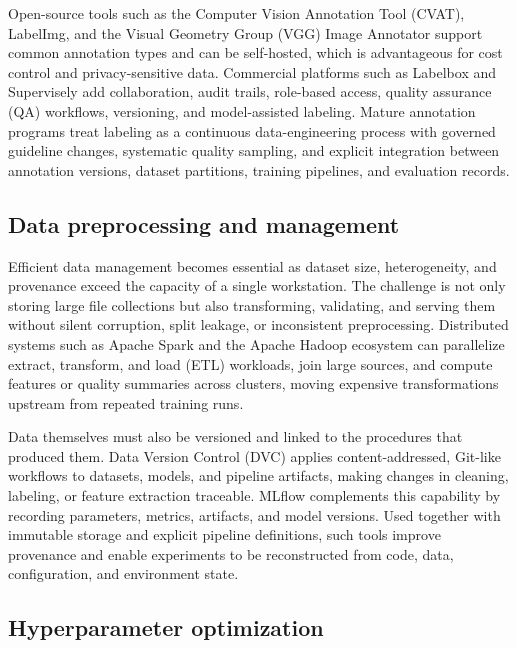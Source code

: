 \documentclass{article}
\newcounter{type}[section]
\begin{document}
Open-source tools such as the Computer Vision Annotation Tool (CVAT), LabelImg, and the Visual Geometry Group (VGG) Image Annotator support common annotation types and can be self-hosted, which is advantageous for cost control and privacy-sensitive data. Commercial platforms such as Labelbox and Supervisely add collaboration, audit trails, role-based access, quality assurance (QA) workflows, versioning, and model-assisted labeling. Mature annotation programs treat labeling as a continuous data-engineering process with governed guideline changes, systematic quality sampling, and explicit integration between annotation versions, dataset partitions, training pipelines, and evaluation records.


\subsection{Data preprocessing and management}

Efficient data management becomes essential as dataset size, heterogeneity, and provenance exceed the capacity of a single workstation. The challenge is not only storing large file collections but also transforming, validating, and serving them without silent corruption, split leakage, or inconsistent preprocessing. Distributed systems such as Apache Spark and the Apache Hadoop ecosystem can parallelize extract, transform, and load (ETL) workloads, join large sources, and compute features or quality summaries across clusters, moving expensive transformations upstream from repeated training runs.

Data themselves must also be versioned and linked to the procedures that produced them. Data Version Control (DVC) applies content-addressed, Git-like workflows to datasets, models, and pipeline artifacts, making changes in cleaning, labeling, or feature extraction traceable. MLflow complements this capability by recording parameters, metrics, artifacts, and model versions. Used together with immutable storage and explicit pipeline definitions, such tools improve provenance and enable experiments to be reconstructed from code, data, configuration, and environment state.


\subsection{Hyperparameter optimization}
\end{document}
